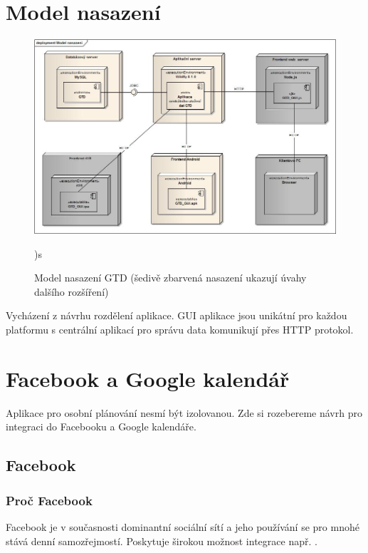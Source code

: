 \documentclass[thesis=B,czech]{FITthesis}[2012/06/26]
\begin{document}
\section{Model nasazení}

\begin{figure}[h!]\centering
	\includegraphics[width=1\textwidth]{pictures/gtd_deployment_model}
	\caption{Model nasazení GTD (šedivě zbarvená nasazení ukazují úvahy dalšího rozšíření)})\label{fig:gtd_deployment_model}s
\end{figure}

Vycházení z návrhu rozdělení aplikace. GUI aplikace jsou unikátní pro každou platformu s centrální aplikací pro správu data komunikují přes HTTP protokol.

\section{Facebook a Google kalendář}

Aplikace pro osobní plánování nesmí být izolovanou. Zde si rozebereme návrh pro integraci do Facebooku a Google kalendáře. 

\subsection{Facebook}

\subsubsection{Proč Facebook}
Facebook\cite{design_facebook} je v současnosti dominantní sociální sítí a jeho používání se pro mnohé stává denní samozřejmostí\cite{design_facebook_usage}. Poskytuje širokou možnost integrace např. \cite{design_facebook_integration}.
\end{document}

